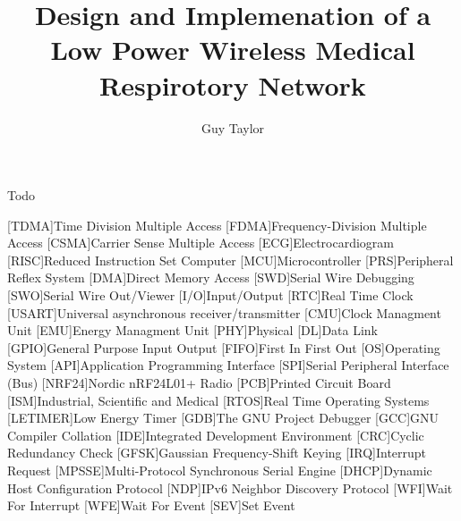 \documentclass[bsc,logo,plainprepages,parskip,abbrevs,10pt]{infthesis}
\title{Design and Implemenation of a Low Power Wireless Medical Respirotory Network}
\author{Guy Taylor}
\begin{document}
\begin{preliminary}

\maketitle

\begin{acknowledgements}
  Todo
\end{acknowledgements}

\standarddeclaration

\tableofcontents

\listoffigures
\listoftables

\begin{acronym}
[TDMA]{Time Division Multiple Access}
[FDMA]{Frequency-Division Multiple Access}
[CSMA]{Carrier Sense Multiple Access}
[ECG]{Electrocardiogram}
[RISC]{Reduced Instruction Set Computer}
[MCU]{Microcontroller}
[PRS]{Peripheral Reflex System}
[DMA]{Direct Memory Access}
[SWD]{Serial Wire Debugging}
[SWO]{Serial Wire Out/Viewer}
[I/O]{Input/Output}
[RTC]{Real Time Clock}
[USART]{Universal asynchronous receiver/transmitter}
[CMU]{Clock Managment Unit}
[EMU]{Energy Managment Unit}
[PHY]{Physical}
[DL]{Data Link}
[GPIO]{General Purpose Input Output}
[FIFO]{First In First Out}
[OS]{Operating System}
[API]{Application Programming Interface}
[SPI]{Serial Peripheral Interface (Bus)}
[NRF24]{Nordic nRF24L01+ Radio}
[PCB]{Printed Circuit Board}
[ISM]{Industrial, Scientific and Medical}
[RTOS]{Real Time Operating Systems}
[LETIMER]{Low Energy Timer}
[GDB]{The GNU Project Debugger}
[GCC]{GNU Compiler Collation}
[IDE]{Integrated Development Environment}
[CRC]{Cyclic Redundancy Check}
[GFSK]{Gaussian Frequency-Shift Keying}
[IRQ]{Interrupt Request}
[MPSSE]{Multi-Protocol Synchronous Serial Engine}
[DHCP]{Dynamic Host Configuration Protocol}
[NDP]{IPv6 Neighbor Discovery Protocol}
[WFI]{Wait For Interrupt}
[WFE]{Wait For Event}
[SEV]{Set Event}
\end{acronym}

\end{preliminary}
\end{document}
